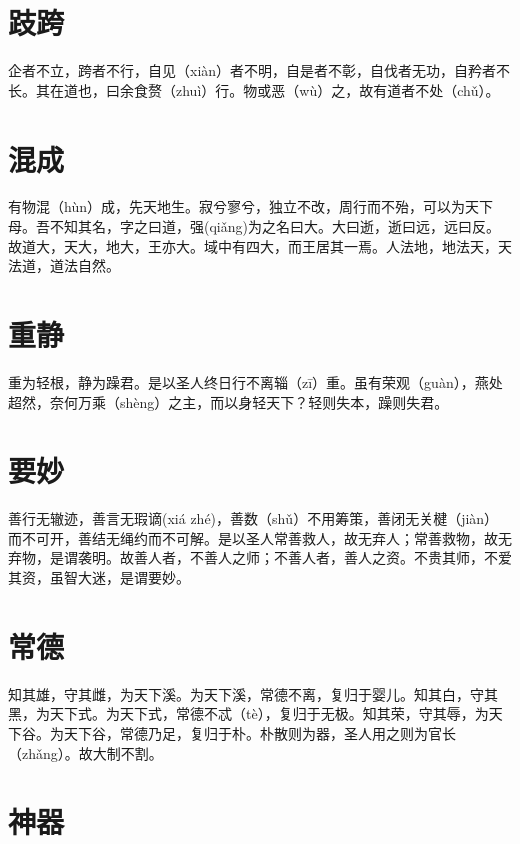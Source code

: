 \documentclass[a4paper,12pt,UTF8,twoside]{ctexbook}
\begin{document}
	
	
	\chapter{跂跨}
	
	企者不立，跨者不行，自见（xiàn）者不明，自是者不彰，自伐者无功，自矜者不长。其在道也，曰余食赘（zhuì）行。物或恶（wù）之，故有道者不处（chǔ）。
	
	
	
	\chapter{混成}
	
	有物混（hùn）成，先天地生。寂兮寥兮，独立不改，周行而不殆，可以为天下母。吾不知其名，字之曰道，强(qiǎng)为之名曰大。大曰逝，逝曰远，远曰反。故道大，天大，地大，王亦大。域中有四大，而王居其一焉。人法地，地法天，天法道，道法自然。
	
	
	

	\chapter{重静}
	重为轻根，静为躁君。是以圣人终日行不离辎（zī）重。虽有荣观（guàn），燕处超然，奈何万乘（shèng）之主，而以身轻天下？轻则失本，躁则失君。
	
	
	
	\chapter{要妙}
	
	善行无辙迹，善言无瑕谪(xiá zhé)，善数（shǔ）不用筹策，善闭无关楗（jiàn）而不可开，善结无绳约而不可解。是以圣人常善救人，故无弃人；常善救物，故无弃物，是谓袭明。故善人者，不善人之师；不善人者，善人之资。不贵其师，不爱其资，虽智大迷，是谓要妙。	
	
	
	\chapter{常德}
	
	知其雄，守其雌，为天下溪。为天下溪，常德不离，复归于婴儿。知其白，守其黑，为天下式。为天下式，常德不忒（tè），复归于无极。知其荣，守其辱，为天下谷。为天下谷，常德乃足，复归于朴。朴散则为器，圣人用之则为官长（zhǎng）。故大制不割。	
	

	\chapter{神器}
		
\end{document}
